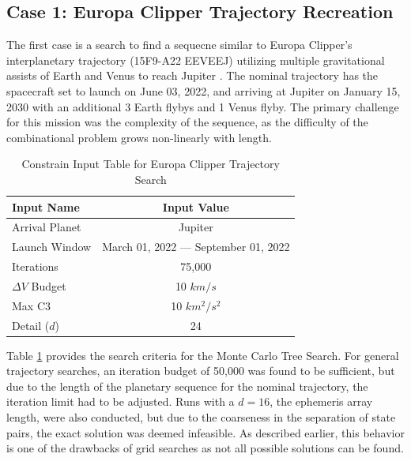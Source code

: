 \documentclass[letterpaper, preprint, paper,11pt]{AAS}	%
\begin{document}
\subsection{Case 1: Europa Clipper Trajectory Recreation}

The first case is a search to find a sequecne similar to Europa Clipper's interplanetary trajectory (15F9-A22 EEVEEJ) utilizing multiple gravitational assists of Earth and Venus to reach Jupiter \cite{Buffington2014}. The nominal trajectory has the spacecraft set to launch on June 03, 2022, and arriving at Jupiter on January 15, 2030 with an additional 3 Earth flybys and 1 Venus flyby. The primary challenge for this mission was the complexity of the sequence, as the difficulty of the combinational problem grows non-linearly with length.

\begin{table}[htb]
    \centering
    \caption{Constrain Input Table for Europa Clipper Trajectory Search}
    \label{table:clipInputs}
    \begin{tabular}{lc}
        \toprule
        \textbf{Input Name} & \textbf{Input Value}\\
        \midrule
        Arrival Planet & Jupiter \\
        Launch Window & March 01, 2022 --- September 01, 2022 \\
        Iterations & 75,000 \\ 
        $\Delta V$ Budget & 10 $km/s$ \\
        Max C3 & 10 $km^2/s^2$ \\
        Detail ($d$) & 24 \\
        \bottomrule
    \end{tabular}
\end{table}

Table \ref*{table:clipInputs} provides the search criteria for the Monte Carlo Tree Search. For general trajectory searches, an iteration budget of 50,000 was found to be sufficient, but due to the length of the planetary sequence for the nominal trajectory, the iteration limit had to be adjusted. Runs with a $d = 16$, the ephemeris array length, were also conducted, but due to the coarseness in the separation of state pairs, the exact solution was deemed infeasible. As described earlier, this behavior is one of the drawbacks of grid searches as not all possible solutions can be found. 
\end{document}
